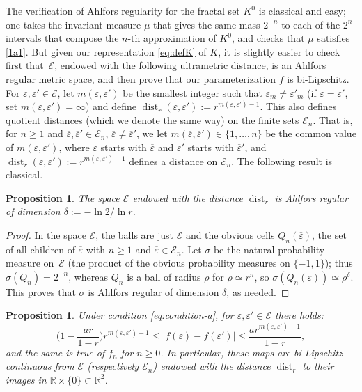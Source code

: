\documentclass[10pt]{amsart}
\let\ol\overline
\numberwithin{equation}{section}
\theoremstyle{plain}
\newtheorem{pro}[lem]{Proposition}
\theoremstyle{definition}
\newcommand{\R}{\mathbb{R}}
\DeclareMathOperator{\dist}{dist}
\newcommand{\cE}{{\mathcal E}}
\begin{document}
The verification of Ahlfors regularity for the fractal set $K^0$ is classical and easy; one takes the invariant
measure $\mu$ that gives the same mass $2^{-n}$ to each of the $2^n$ intervals that compose the
$n$-th approximation of $K^0$, and checks that $\mu$ satisfies \eqref{1a1}.
But given our representation \eqref{eq:defK} of $K$, it is slightly easier to check first that~$\cE$, endowed with the following ultrametric distance, is an Ahlfors regular metric space, and then prove
that our parameterization $f$ is bi-Lipschitz.
For $\varepsilon, \varepsilon' \in \cE$,
let $m(\varepsilon,\varepsilon')$ be the smallest integer such that $\varepsilon_m\neq \varepsilon'_m$
(if $\varepsilon = \varepsilon'$, set $m(\varepsilon,\varepsilon')=\infty$) and define
$\dist_r(\varepsilon,\varepsilon'):= r^{m(\varepsilon,\varepsilon')-1}$.
This also defines quotient distances (which we denote the same way) on the finite sets $\cE_n$.
That is, for $n \geq 1$ and $\ol\varepsilon,\ol\varepsilon'\in \cE_n$, $\ol\varepsilon \neq\ol\varepsilon'$,
we let $m(\ol\varepsilon,\ol\varepsilon') \in \{1,\dots,n\}$ be the common value of $m(\varepsilon,\varepsilon')$,
where $\varepsilon$ starts with $\ol\varepsilon$ and $\varepsilon'$ starts with $\ol\varepsilon'$, and
$\dist_r(\varepsilon,\varepsilon'):= r^{m(\varepsilon,\varepsilon')-1}$ defines a distance on $\cE_n$.
The following result is classical.

\begin{pro}\label{pro:AR}
The space $\cE$ endowed with the distance $\dist_r$ is Ahlfors regular of dimension $\delta :=-\ln 2/\ln r$.
\end{pro}

\begin{proof}
In the space $\cE$, the balls are just $\cE$ and the obvious cells $Q_n(\ol \varepsilon)$, \ie the set of all children of $\ol\varepsilon$ with $n \geq 1$ and
$\ol\varepsilon \in \cE_n$. Let $\sigma$ be the natural probability measure on~$\cE$
(the product of the obvious probability measures on $\{ -1, 1 \}$); thus $\sigma(Q_n) = 2^{-n}$,
whereas $Q_n$ is a ball of radius $\rho$ for $\rho \simeq r^n$, so $\sigma(Q_n(\ol \varepsilon)) \simeq \rho^\delta$.
This proves that $\sigma$ is Ahlfors regular of dimension $\delta$, as needed.
\end{proof}

\begin{pro}\label{pro:bilip}
Under condition \eqref{eq:condition-a}, for $\varepsilon, \varepsilon' \in \cE$
there holds:
\begin{equation}\label{eq:bilip-N}
\Big (1- \dfrac{ar}{1-r}\Big )r^{m(\varepsilon,\varepsilon')-1} \le |f(\varepsilon)-f(\varepsilon')| \le \dfrac{a r^{m(\varepsilon,\varepsilon')-1}}{1-r},
\end{equation}
and the same is true of $f_n$ for $n\ge 0$. In particular, these maps are bi-Lipschitz continuous from $\cE$
(respectively $\cE_{n}$) endowed with the distance $\dist_r$ to their images in $\R\times \{0\} \subset \R^2$.
\end{pro}
\end{document}
